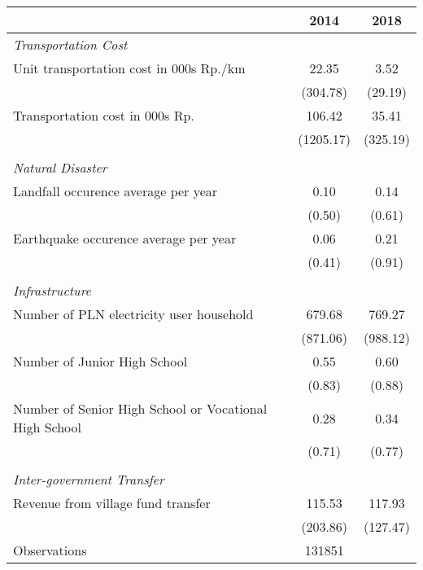 \begin{tabular}{l*{2}{c}}
\hline\hline
                    &        2014&        2018\\
\hline
\emph{Transportation Cost}&            &            \\
\hspace{0.25cm} Unit transportation cost in 000s Rp./km&       22.35&        3.52\\
                    &    (304.78)&     (29.19)\\
\hspace{0.25cm} Transportation cost in 000s Rp.&      106.42&       35.41\\
                    &   (1205.17)&    (325.19)\\
\vspace{0.05em} \\ \emph{Natural Disaster}&            &            \\
\hspace{0.25cm} Landfall occurence average per year&        0.10&        0.14\\
                    &      (0.50)&      (0.61)\\
\hspace{0.25cm} Earthquake occurence average per year&        0.06&        0.21\\
                    &      (0.41)&      (0.91)\\
\vspace{0.05em} \\ \emph{Infrastructure}&            &            \\
\hspace{0.25cm} Number of PLN electricity user household&      679.68&      769.27\\
                    &    (871.06)&    (988.12)\\
\hspace{0.25cm} Number of Junior High School&        0.55&        0.60\\
                    &      (0.83)&      (0.88)\\
\hspace{0.25cm} Number of Senior High School or Vocational High School&        0.28&        0.34\\
                    &      (0.71)&      (0.77)\\
\vspace{0.05em} \\ \emph{Inter-government Transfer}&            &            \\
\hspace{0.25cm} Revenue from village fund transfer&      115.53&      117.93\\
                    &    (203.86)&    (127.47)\\
\hline
Observations        &      131851&            \\
\hline\hline
\end{tabular}
